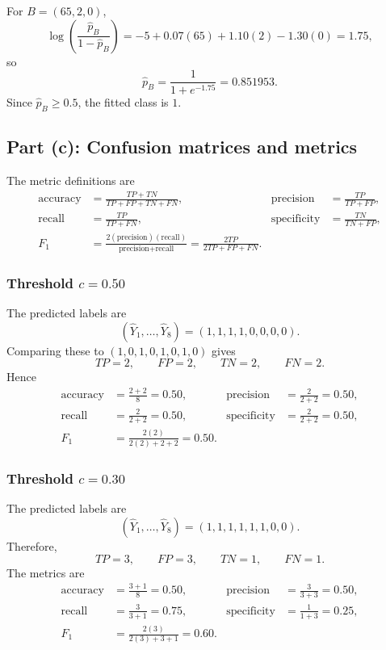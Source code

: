 \documentclass[11pt]{article}
\newcommand{\answer}[1]{\boxed{\displaystyle #1}}
\begin{document}
For \(B=(65,2,0)\),
\[
\log\left(\frac{\hat p_B}{1-\hat p_B}\right)
=-5+0.07(65)+1.10(2)-1.30(0)=1.75,
\]
so
\[
\hat p_B=\frac1{1+e^{-1.75}}=\answer{0.851953}.
\]
Since \(\hat p_B\geq0.5\), the fitted class is \(\answer{1}\).

\subsection{Part (c): Confusion matrices and metrics}

The metric definitions are
\[
\begin{aligned}
\text{accuracy}&=\frac{TP+TN}{TP+FP+TN+FN},&
\text{precision}&=\frac{TP}{TP+FP},\\
\text{recall}&=\frac{TP}{TP+FN},&
\text{specificity}&=\frac{TN}{TN+FP},\\
F_1&=\frac{2(\text{precision})(\text{recall})}
{\text{precision}+\text{recall}}
=\frac{2TP}{2TP+FP+FN}.
\end{aligned}
\]

\subsubsection{Threshold \(c=0.50\)}

The predicted labels are
\[
(\hat Y_1,\ldots,\hat Y_8)=(1,1,1,1,0,0,0,0).
\]
Comparing these to \((1,0,1,0,1,0,1,0)\) gives
\[
TP=2,\qquad FP=2,\qquad TN=2,\qquad FN=2.
\]
Hence
\[
\begin{aligned}
\text{accuracy}&=\frac{2+2}{8}=0.50,&
\text{precision}&=\frac{2}{2+2}=0.50,\\
\text{recall}&=\frac{2}{2+2}=0.50,&
\text{specificity}&=\frac{2}{2+2}=0.50,\\
F_1&=\frac{2(2)}{2(2)+2+2}=\answer{0.50}.
\end{aligned}
\]

\subsubsection{Threshold \(c=0.30\)}

The predicted labels are
\[
(\hat Y_1,\ldots,\hat Y_8)=(1,1,1,1,1,1,0,0).
\]
Therefore,
\[
TP=3,\qquad FP=3,\qquad TN=1,\qquad FN=1.
\]
The metrics are
\[
\begin{aligned}
\text{accuracy}&=\frac{3+1}{8}=\answer{0.50},&
\text{precision}&=\frac{3}{3+3}=\answer{0.50},\\
\text{recall}&=\frac{3}{3+1}=\answer{0.75},&
\text{specificity}&=\frac{1}{1+3}=\answer{0.25},\\
F_1&=\frac{2(3)}{2(3)+3+1}=\answer{0.60}.
\end{aligned}
\]
\end{document}
